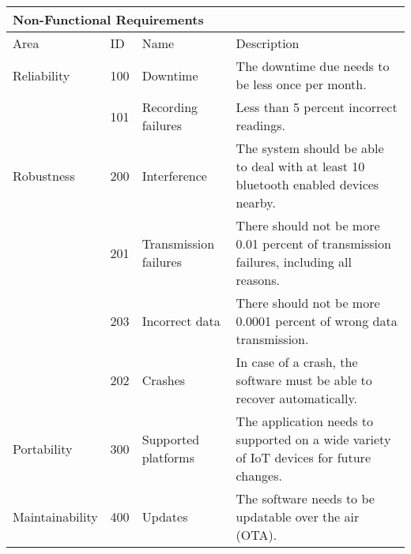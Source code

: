    \clearpage
    \begin{table}[]
        \begin{tabular}{ l l p{2.5cm} p{7.1cm}}
        \multicolumn{4}{l}{Non-Functional Requirements}                                                                                                                                                    \\ \hline
        Area            & ID  & Name                  & Description                                                                                                                                        \\ \hline
        Reliability     & 100 & Downtime              & The downtime due needs to be less once per month.                                                                                                  \\
                        & 101 & Recording failures    & Less than 5 percent incorrect readings.                                                                                                            \\
        Robustness      & 200 & Interference          & The system should be able to deal with at least 10 bluetooth enabled devices  nearby.                                                              \\
                        & 201 & Transmission failures & There should not be more 0.01 percent of transmission failures, including all reasons.                                                             \\
                        & 203 & Incorrect data        & There should not be more 0.0001 percent of wrong data transmission.                                                                                \\
                        & 202 & Crashes               & In case of a crash, the software must be able to recover automatically.                                                                            \\
        Portability     & 300 & Supported platforms   & The application needs to supported on a wide variety of IoT devices for future changes.                                                            \\
        Maintainability & 400 & Updates               & The software needs to be updatable over the air (OTA).                                                                                             \\

\end{tabular}
\end{table}

